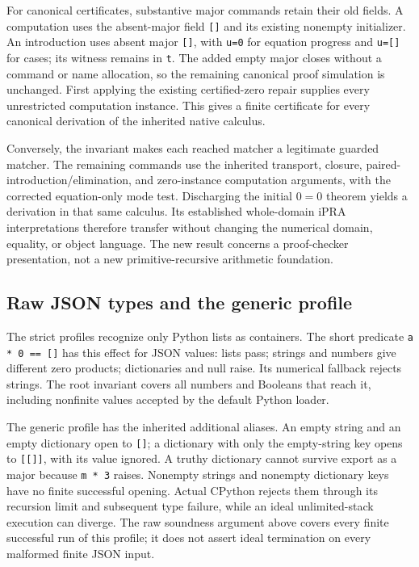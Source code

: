 \documentclass[11pt,letterpaper]{article}
\theoremstyle{definition}\newtheorem{definition}[theorem]{Definition}
\theoremstyle{remark}\newtheorem{remark}[theorem]{Remark}
\begin{document}
For canonical certificates, substantive major commands retain their
old fields.  A computation uses the absent-major field \texttt{[]} and
its existing nonempty initializer.  An introduction uses absent major
\texttt{[]}, with \texttt{u=0} for equation progress and
\texttt{u=[]} for cases; its witness remains in \texttt{t}.
The added empty major closes without a command or name allocation, so
the remaining canonical proof simulation is unchanged.  First applying
the existing certified-zero repair supplies every unrestricted
computation instance.  This gives a finite certificate for every
canonical derivation of the inherited native calculus.

Conversely, the invariant makes each reached matcher a legitimate
guarded matcher.  The remaining commands use the inherited
transport, closure, paired-introduction/elimination, and zero-instance
computation arguments, with the corrected equation-only mode test.
Discharging the initial $0=0$ theorem yields a derivation in that same
calculus.  Its established whole-domain iPRA interpretations therefore
transfer without changing the numerical domain, equality, or object
language.  The new result concerns a proof-checker presentation, not a
new primitive-recursive arithmetic foundation.

\subsection{Raw JSON types and the generic profile}

The strict profiles recognize only Python lists as containers.  The
short predicate \texttt{a * 0 == []} has this effect for JSON values:
lists pass; strings and numbers give different zero products;
dictionaries and null raise.  Its numerical fallback rejects strings.
The root invariant covers all numbers and Booleans that reach it,
including nonfinite values accepted by the default Python loader.

The generic profile has the inherited additional aliases.  An empty
string and an empty dictionary open to \texttt{[]}; a dictionary with
only the empty-string key opens to \texttt{[[]]}, with its value ignored.
A truthy dictionary cannot survive export as a major because
\texttt{m * 3} raises.  Nonempty strings and nonempty dictionary keys
have no finite successful opening.  Actual CPython rejects them through
its recursion limit and subsequent type failure, while an ideal
unlimited-stack execution can diverge.  The raw soundness argument
above covers every finite successful run of this profile; it does not
assert ideal termination on every malformed finite JSON input.
\end{document}
